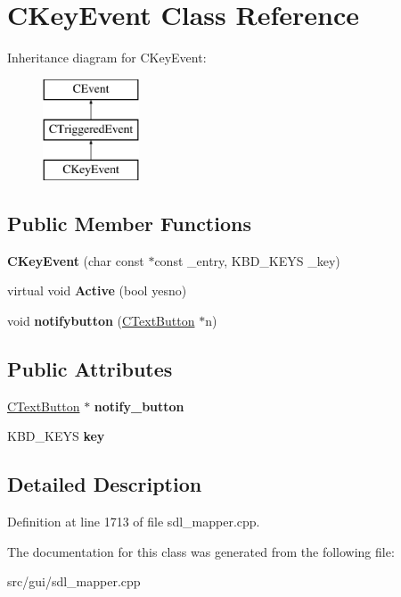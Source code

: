 \hypertarget{classCKeyEvent}{\section{C\-Key\-Event Class Reference}
\label{classCKeyEvent}
}
Inheritance diagram for C\-Key\-Event\-:\begin{figure}[H]
\begin{center}
\leavevmode
\includegraphics[height=3.000000cm]{classCKeyEvent}
\end{center}
\end{figure}
\subsection*{Public Member Functions}
\begin{DoxyCompactItemize}
\item 
\hypertarget{classCKeyEvent_a26db3746811c8498d0f7f4ca7e52d360}{{\bfseries C\-Key\-Event} (char const $\ast$const \-\_\-entry, K\-B\-D\-\_\-\-K\-E\-Y\-S \-\_\-key)}\label{classCKeyEvent_a26db3746811c8498d0f7f4ca7e52d360}

\item 
\hypertarget{classCKeyEvent_a184277d7cd9c41090ae646a3b9887cf3}{virtual void {\bfseries Active} (bool yesno)}\label{classCKeyEvent_a184277d7cd9c41090ae646a3b9887cf3}

\item 
\hypertarget{classCKeyEvent_ab05ca088ef648a08242be4f03adcbc00}{void {\bfseries notifybutton} (\hyperlink{classCTextButton}{C\-Text\-Button} $\ast$n)}\label{classCKeyEvent_ab05ca088ef648a08242be4f03adcbc00}

\end{DoxyCompactItemize}
\subsection*{Public Attributes}
\begin{DoxyCompactItemize}
\item 
\hypertarget{classCKeyEvent_a93407353bb472fc93fa7962f1c2e7933}{\hyperlink{classCTextButton}{C\-Text\-Button} $\ast$ {\bfseries notify\-\_\-button}}\label{classCKeyEvent_a93407353bb472fc93fa7962f1c2e7933}

\item 
\hypertarget{classCKeyEvent_aa5d774b3b526c036d79dbf87ba437afd}{K\-B\-D\-\_\-\-K\-E\-Y\-S {\bfseries key}}\label{classCKeyEvent_aa5d774b3b526c036d79dbf87ba437afd}

\end{DoxyCompactItemize}


\subsection{Detailed Description}


Definition at line 1713 of file sdl\-\_\-mapper.\-cpp.



The documentation for this class was generated from the following file\-:\begin{DoxyCompactItemize}
\item 
src/gui/sdl\-\_\-mapper.\-cpp\end{DoxyCompactItemize}
